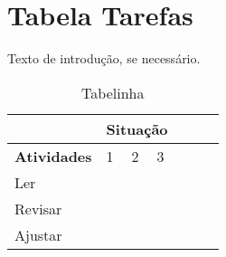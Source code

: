 \chapter{Tabela Tarefas}

Texto de introdução, se necessário.

\begin{table}[H]
	\centering
	\caption{Tabelinha}
	\label{tabela:tabelinha}
	\begin{tabular}{lllllll}
		& \multicolumn{3}{l}{\textbf{Situação}} \\
		\hline                                %
		
		\textbf{Atividades}                 & 1   & 2   & 3  \\
		\hline                                %
		Ler  & \checkmark   & \checkmark   & \checkmark  \\
		Revisar &     & \checkmark   & \checkmark  \\
		Ajustar       & \checkmark   & \checkmark   & \checkmark  
	\end{tabular}
\end{table}


